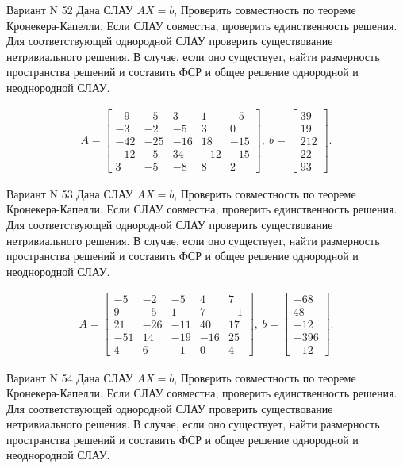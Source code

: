 \documentclass[11pt]{report}
\begin{document}
Вариант N 52
Дана СЛАУ $AX = b$,
Проверить совместность по теореме Кронекера-Капелли. Если СЛАУ совместна, проверить единственность решения.
Для соответствующей однородной СЛАУ проверить существование нетривиального решения. В случае, если оно существует,
найти размерность пространства решений и составить ФСР и общее решение однородной  и неоднородной СЛАУ.


\begin{align*}
 A = \left[\begin{matrix}-9 & -5 & 3 & 1 & -5\\-3 & -2 & -5 & 3 & 0\\-42 & -25 & -16 & 18 & -15\\-12 & -5 & 34 & -12 & -15\\3 & -5 & -8 & 8 & 2\end{matrix}\right],
\ b = \left[\begin{matrix}39\\19\\212\\22\\93\end{matrix}\right]. 
 \end{align*}

Вариант N 53
Дана СЛАУ $AX = b$,
Проверить совместность по теореме Кронекера-Капелли. Если СЛАУ совместна, проверить единственность решения.
Для соответствующей однородной СЛАУ проверить существование нетривиального решения. В случае, если оно существует,
найти размерность пространства решений и составить ФСР и общее решение однородной  и неоднородной СЛАУ.


\begin{align*}
 A = \left[\begin{matrix}-5 & -2 & -5 & 4 & 7\\9 & -5 & 1 & 7 & -1\\21 & -26 & -11 & 40 & 17\\-51 & 14 & -19 & -16 & 25\\4 & 6 & -1 & 0 & 4\end{matrix}\right],
\ b = \left[\begin{matrix}-68\\48\\-12\\-396\\-12\end{matrix}\right]. 
 \end{align*}

Вариант N 54
Дана СЛАУ $AX = b$,
Проверить совместность по теореме Кронекера-Капелли. Если СЛАУ совместна, проверить единственность решения.
Для соответствующей однородной СЛАУ проверить существование нетривиального решения. В случае, если оно существует,
найти размерность пространства решений и составить ФСР и общее решение однородной  и неоднородной СЛАУ.
\end{document}
